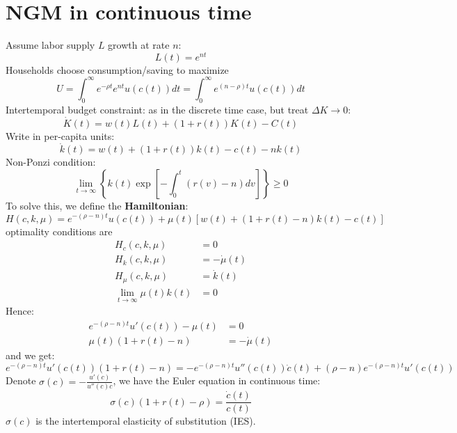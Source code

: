 \section{NGM in continuous time}

Assume labor supply $L$ growth at rate $n$:
\[ L(t) = e^{nt} \]
Households choose consumption/saving to maximize
\[ U = \int_0^{\infty} e^{-\rho t}e^{nt}u(c(t))dt = \int_0^{\infty} e^{(n-\rho)t}u(c(t))dt \]
Intertemporal budget constraint: as in the discrete time case, but treat $\Delta K \to 0$:
\[ \dot{K}(t) = w(t)L(t) + (1 + r(t))K(t) - C(t) \]
Write in per-capita units:
\[ \dot{k}(t) = w(t) + (1 + r(t))k(t) - c(t) - nk(t) \]
Non-Ponzi condition:
\[ \lim_{t \to \infty} \left\{k(t)\exp\left[-\int_0^t(r(v) - n)dv\right]\right\} \geq 0 \]
To solve this, we define the \textbf{Hamiltonian}:
\[ H(c, k, \mu) = e^{-(\rho - n)t}u(c(t)) + \mu(t)[w(t) + (1 + r(t) - n)k(t) - c(t)] \]
optimality conditions are
\begin{align*}
    H_c(c, k, \mu) &= 0 \\
    H_k(c, k, \mu) &= -\dot{\mu}(t) \\
    H_{\mu}(c, k, \mu) &= \dot{k}(t) \\
    \lim_{t \to \infty} \mu(t)k(t) &= 0
\end{align*}
Hence:
\begin{align*}
    e^{-(\rho - n)t}u'(c(t)) - \mu(t) &= 0 \\
    \mu(t)(1 + r(t) - n) &= -\dot{\mu}(t)
\end{align*}
and we get:
\[ e^{-(\rho - n)t}u'(c(t))(1 + r(t) - n) = -e^{-(\rho - n)t}u''(c(t))\dot{c}(t) + (\rho - n)e^{-(\rho - n)t}u'(c(t)) \]
Denote $\sigma(c) = -\frac{u'(c)}{u''(c)c}$, we have the Euler equation in continuous time:
\[ \sigma(c)(1 + r(t) - \rho) = \frac{\dot{c}(t)}{c(t)} \]
$\sigma(c)$ is the intertemporal elasticity of substitution (IES).
